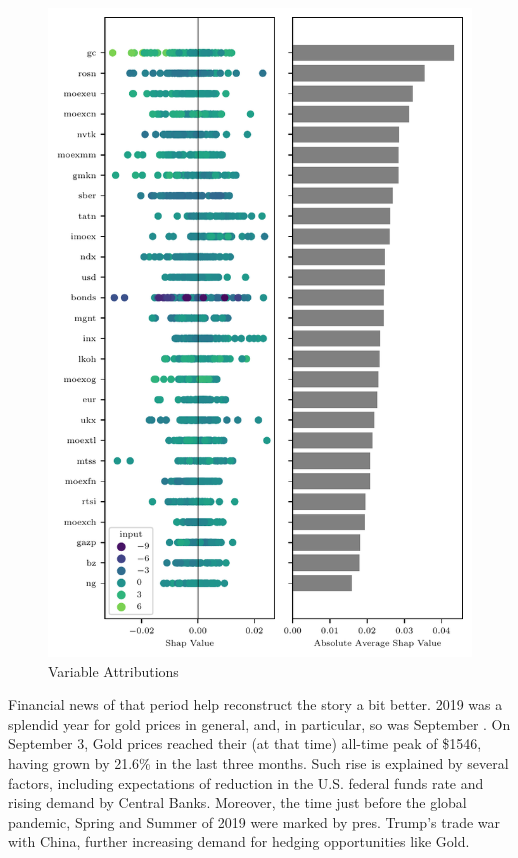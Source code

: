 \documentclass[review, authoryear]{elsarticle}
\begin{document}
\begin{figure}
	\centering
	\includegraphics{beeswarm.pdf}
	\caption{Variable Attributions}
	\label{fig:vars_shap}
\end{figure}

Financial news of that period help reconstruct the story a bit better. 2019 was a splendid year for gold prices in general, and, in particular, so was September \citep{sieron_gold_2020, koh_gold_2019}. On September 3, Gold prices reached their (at that time) all-time peak of \$1546, having grown by 21.6\% in the last three months. Such rise is explained by several factors, including expectations of reduction in the U.S. federal funds rate and rising demand by Central Banks. Moreover, the time just before the global pandemic, Spring and Summer of 2019 were marked by pres. Trump's trade war with China, further increasing demand for hedging opportunities like Gold.
\end{document}
